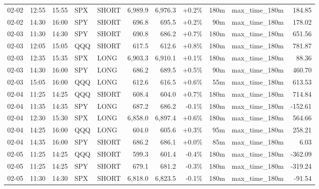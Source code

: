 \documentclass[11pt,a4paper,twoside]{article}
\begin{document}
\begin{center}
\begin{longtable}{>{\color{txtmain}}l l l l l r r r r >{\color{txtmain}}l r}
02-02 & 12:55 & 15:55 & SPX & SHORT & 6,989.9 & 6,976.3 & \textcolor{wingreen}{+0.2\%} & 180m & max\_time\_180m & \textcolor{wingreen}{184.85} \\
02-02 & 14:30 & 16:00 & SPY & SHORT & 696.8 & 695.5 & \textcolor{wingreen}{+0.2\%} & 90m & max\_time\_180m & \textcolor{wingreen}{178.02} \\
02-03 & 11:30 & 14:30 & SPY & SHORT & 690.8 & 686.2 & \textcolor{wingreen}{+0.7\%} & 180m & max\_time\_180m & \textcolor{wingreen}{651.56} \\
02-03 & 12:05 & 15:05 & QQQ & SHORT & 617.5 & 612.6 & \textcolor{wingreen}{+0.8\%} & 180m & max\_time\_180m & \textcolor{wingreen}{781.87} \\
02-03 & 12:35 & 15:35 & SPX & LONG & 6,903.3 & 6,910.1 & \textcolor{wingreen}{+0.1\%} & 180m & max\_time\_180m & \textcolor{wingreen}{88.36} \\
02-03 & 14:30 & 16:00 & SPY & LONG & 686.2 & 689.5 & \textcolor{wingreen}{+0.5\%} & 90m & max\_time\_180m & \textcolor{wingreen}{460.70} \\
02-03 & 15:05 & 16:00 & QQQ & LONG & 612.6 & 616.5 & \textcolor{wingreen}{+0.6\%} & 55m & max\_time\_180m & \textcolor{wingreen}{613.53} \\
02-04 & 11:25 & 14:25 & QQQ & SHORT & 608.4 & 604.0 & \textcolor{wingreen}{+0.7\%} & 180m & max\_time\_180m & \textcolor{wingreen}{714.84} \\
02-04 & 11:35 & 14:35 & SPY & LONG & 687.2 & 686.2 & \textcolor{lossred}{-0.1\%} & 180m & max\_time\_180m & \textcolor{lossred}{-152.61} \\
02-04 & 12:30 & 15:30 & SPX & LONG & 6,858.0 & 6,897.4 & \textcolor{wingreen}{+0.6\%} & 180m & max\_time\_180m & \textcolor{wingreen}{564.66} \\
02-04 & 14:25 & 16:00 & QQQ & LONG & 604.0 & 605.6 & \textcolor{wingreen}{+0.3\%} & 95m & max\_time\_180m & \textcolor{wingreen}{258.21} \\
02-04 & 14:35 & 16:00 & SPY & SHORT & 686.2 & 686.1 & \textcolor{wingreen}{+0.0\%} & 85m & max\_time\_180m & \textcolor{wingreen}{6.03} \\
02-05 & 11:25 & 14:25 & QQQ & SHORT & 599.3 & 601.4 & \textcolor{lossred}{-0.4\%} & 180m & max\_time\_180m & \textcolor{lossred}{-362.09} \\
02-05 & 11:25 & 14:25 & SPY & SHORT & 679.1 & 681.2 & \textcolor{lossred}{-0.3\%} & 180m & max\_time\_180m & \textcolor{lossred}{-319.24} \\
02-05 & 11:30 & 14:30 & SPX & SHORT & 6,818.0 & 6,823.5 & \textcolor{lossred}{-0.1\%} & 180m & max\_time\_180m & \textcolor{lossred}{-91.54} \\

\end{longtable}
\end{center}
\end{document}
